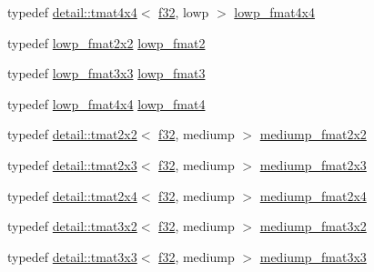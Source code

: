 \begin{DoxyCompactItemize}
\item 
typedef \hyperlink{structglm_1_1detail_1_1tmat4x4}{detail\+::tmat4x4}$<$ \hyperlink{group__gtc__type__precision_ga0ec999b57f5330d9021256e96038df04}{f32}, lowp $>$ \hyperlink{group__gtc__type__precision_ga9ff955b170643f547661d2e7263ee426}{lowp\+\_\+fmat4x4}
\item 
typedef \hyperlink{group__gtc__type__precision_ga99367a30c64035d7e7f76410105d10e3}{lowp\+\_\+fmat2x2} \hyperlink{group__gtc__type__precision_ga9bafb192cb7327d543ad55be2e6e675c}{lowp\+\_\+fmat2}
\item 
typedef \hyperlink{group__gtc__type__precision_ga25b389b52269f3256f015b4fff5789c2}{lowp\+\_\+fmat3x3} \hyperlink{group__gtc__type__precision_ga88ae00cab6aae48d56700915c7799973}{lowp\+\_\+fmat3}
\item 
typedef \hyperlink{group__gtc__type__precision_ga9ff955b170643f547661d2e7263ee426}{lowp\+\_\+fmat4x4} \hyperlink{group__gtc__type__precision_ga00dfb85ec53bb5f173747f73d13c1b8b}{lowp\+\_\+fmat4}
\item 
typedef \hyperlink{structglm_1_1detail_1_1tmat2x2}{detail\+::tmat2x2}$<$ \hyperlink{group__gtc__type__precision_ga0ec999b57f5330d9021256e96038df04}{f32}, mediump $>$ \hyperlink{group__gtc__type__precision_gae9af1d96efbaeeb5c5edd9c7b0a24fa5}{mediump\+\_\+fmat2x2}
\item 
typedef \hyperlink{structglm_1_1detail_1_1tmat2x3}{detail\+::tmat2x3}$<$ \hyperlink{group__gtc__type__precision_ga0ec999b57f5330d9021256e96038df04}{f32}, mediump $>$ \hyperlink{group__gtc__type__precision_gaae7081e19f495e7cdbf727e1550b95a8}{mediump\+\_\+fmat2x3}
\item 
typedef \hyperlink{structglm_1_1detail_1_1tmat2x4}{detail\+::tmat2x4}$<$ \hyperlink{group__gtc__type__precision_ga0ec999b57f5330d9021256e96038df04}{f32}, mediump $>$ \hyperlink{group__gtc__type__precision_ga8f793d90a5a6bea23c13ad195fcb5de2}{mediump\+\_\+fmat2x4}
\item 
typedef \hyperlink{structglm_1_1detail_1_1tmat3x2}{detail\+::tmat3x2}$<$ \hyperlink{group__gtc__type__precision_ga0ec999b57f5330d9021256e96038df04}{f32}, mediump $>$ \hyperlink{group__gtc__type__precision_ga40681f25413b8705b16da2f534692f59}{mediump\+\_\+fmat3x2}
\item 
typedef \hyperlink{structglm_1_1detail_1_1tmat3x3}{detail\+::tmat3x3}$<$ \hyperlink{group__gtc__type__precision_ga0ec999b57f5330d9021256e96038df04}{f32}, mediump $>$ \hyperlink{group__gtc__type__precision_gaa7f015dd5b962a658178bb881d4620cc}{mediump\+\_\+fmat3x3}
\item 

\end{DoxyCompactItemize}
